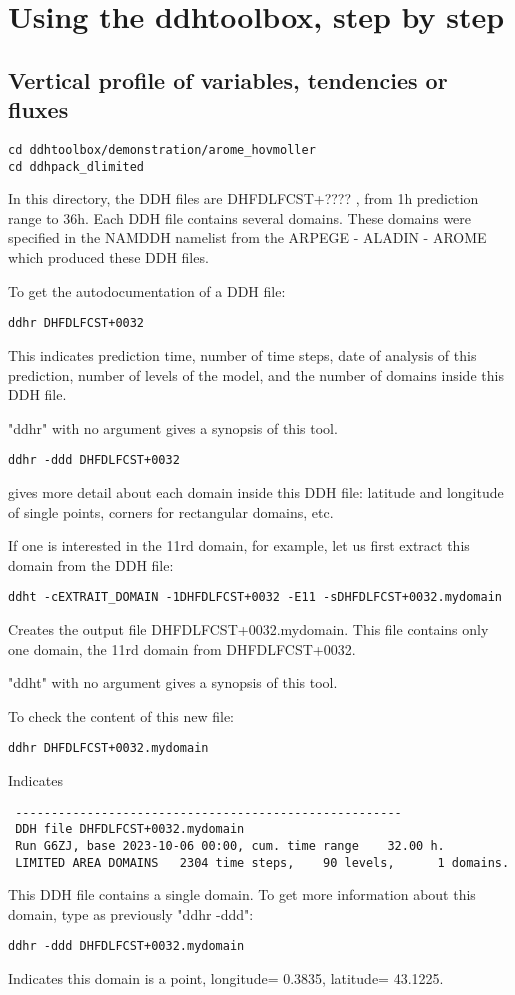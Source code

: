 \section{Using the ddhtoolbox, step by step} \label{stebs}
\subsection{Vertical profile of variables, tendencies or fluxes}

{\small \begin{verbatim} 
cd ddhtoolbox/demonstration/arome_hovmoller
cd ddhpack_dlimited
\end{verbatim}}
\noi In this directory, the DDH files are DHFDLFCST+???? , from 1h prediction range to 36h. Each  DDH file contains several domains. These domains were specified in the NAMDDH namelist from the ARPEGE - ALADIN - AROME which produced these DDH files.

\noi To get the autodocumentation of a DDH file:
{\small \begin{verbatim} 
ddhr DHFDLFCST+0032
\end{verbatim}}
\noi This indicates prediction time, number of time steps, date of analysis of this prediction, number of levels of the model, and the number of domains inside this DDH file.

\noi "ddhr" with no argument gives a synopsis of this tool.

{\small \begin{verbatim} 
ddhr -ddd DHFDLFCST+0032
\end{verbatim}}
\noi gives more detail about each domain inside this DDH file: latitude and longitude of single points, corners for rectangular domains, etc.

\noi If one is interested in the 11rd domain, for example, let us first extract this domain from the DDH file:
{\small \begin{verbatim} 
ddht -cEXTRAIT_DOMAIN -1DHFDLFCST+0032 -E11 -sDHFDLFCST+0032.mydomain
\end{verbatim}}

\noi Creates the output file DHFDLFCST+0032.mydomain. This file contains only one domain, the 11rd domain from DHFDLFCST+0032. 

\noi "ddht" with no argument gives a synopsis of this tool.

\noi To check the content of this new file:
{\small \begin{verbatim} 
ddhr DHFDLFCST+0032.mydomain
\end{verbatim}}
\noi Indicates 
{\small \begin{verbatim} 
 ------------------------------------------------------
 DDH file DHFDLFCST+0032.mydomain
 Run G6ZJ, base 2023-10-06 00:00, cum. time range    32.00 h.
 LIMITED AREA DOMAINS   2304 time steps,    90 levels,      1 domains.
\end{verbatim}}
\noi This DDH file contains a single domain. To get more information about this domain, type as previously "ddhr -ddd":
{\small \begin{verbatim} 
ddhr -ddd DHFDLFCST+0032.mydomain
\end{verbatim}}
\noi Indicates this domain is a point, longitude=   0.3835, latitude=  43.1225.

